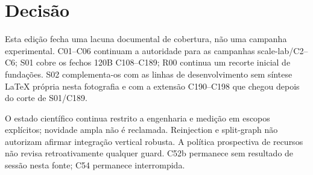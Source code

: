 \section{Decisão}
Esta edição fecha uma lacuna documental de cobertura, não uma campanha experimental. C01–C06 continuam a autoridade para as campanhas scale-lab/C2–C6; S01 cobre os fechos 120B C108–C189; R00 continua um recorte inicial de fundações. S02 complementa-os com as linhas de desenvolvimento sem síntese LaTeX própria nesta fotografia e com a extensão C190--C198 que chegou depois do corte de S01/C189.

O estado científico continua restrito a engenharia e medição em escopos explícitos; novidade ampla não é reclamada. Reinjection e split-graph não autorizam afirmar integração vertical robusta. A política prospectiva de recursos não revisa retroativamente qualquer guard. C52b permanece sem resultado de sessão nesta fonte; C54 permanece interrompida.
